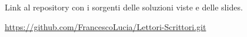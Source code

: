 \documentclass[10pt]{beamer}
\begin{document}
	
	
	\begin{frame}
		\centerline{Link al repository con i sorgenti delle soluzioni viste e delle slides.}
		
		\centerline{\href{https://github.com/FrancescoLucia/Lettori-Scrittori.git}{https://github.com/FrancescoLucia/Lettori-Scrittori.git}}
	\end{frame}
	
	
\end{document}
